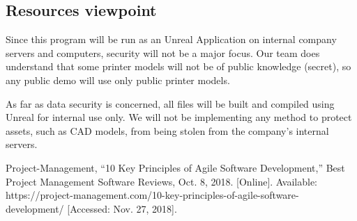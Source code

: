 \documentclass[onecolumn, draftclsnofoot,10pt, compsoc]{IEEEtran}
\begin{document}
\subsection{Resources viewpoint}
Since this program will be run as an Unreal Application on internal company servers and computers, security will not be a major focus. Our team does understand that some printer models will not be of public knowledge (secret), so any public demo will use only public printer models.

As far as data security is concerned, all files will be built and compiled using Unreal for internal use only. We will not be implementing any method to protect assets, such as CAD models, from being stolen from the company's internal servers.
\appendices
\begin{thebibliography}{}
Project-Management, “10 Key Principles of Agile Software Development,” Best Project Management Software Reviews, Oct. 8, 2018. [Online]. Available: https://project-management.com/10-key-principles-of-agile-software-development/ [Accessed: Nov. 27, 2018].


\end{thebibliography}


\end{document}
